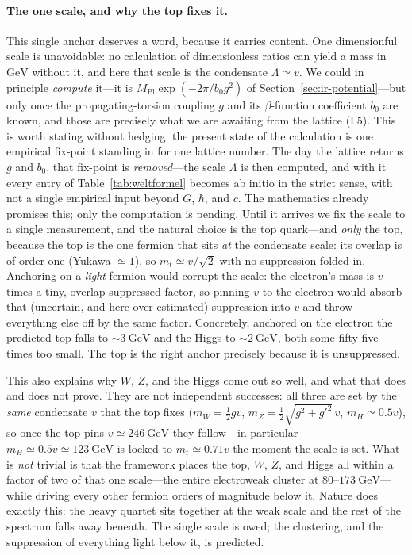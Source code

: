 \paragraph{The one scale, and why the top fixes it.}
This single anchor deserves a word, because it carries content. One dimensionful scale is
unavoidable: no calculation of dimensionless ratios can yield a mass in $\mathrm{GeV}$ without
it, and here that scale is the condensate $\Lambda\simeq v$. We could in principle \emph{compute}
it---it is $M_{\mathrm{Pl}}\exp(-2\pi/b_0 g^2)$ of Section~\ref{sec:ir-potential}---but only once
the propagating-torsion coupling $g$ and its $\beta$-function coefficient $b_0$ are known, and
those are precisely what we are awaiting from the lattice (L5). This is worth stating without
hedging: the present state of the calculation is one empirical fix-point standing in for one
lattice number. The day the lattice returns $g$ and $b_0$, that fix-point is \emph{removed}---the
scale $\Lambda$ is then computed, and with it every entry of Table~\ref{tab:weltformel} becomes
ab initio in the strict sense, with not a single empirical input beyond $G$, $\hbar$, and $c$. The
mathematics already promises this; only the computation is pending. Until it arrives we fix the
scale to a single measurement, and the natural choice is
the top quark---and \emph{only} the top, because the top is the one fermion that sits \emph{at}
the condensate scale: its overlap is of order one (Yukawa $\simeq1$), so $m_t\simeq v/\sqrt2$ with
no suppression folded in. Anchoring on a \emph{light} fermion would corrupt the scale: the
electron's mass is $v$ times a tiny, overlap-suppressed factor, so pinning $v$ to the electron
would absorb that (uncertain, and here over-estimated) suppression into $v$ and throw everything
else off by the same factor. Concretely, anchored on the electron the predicted top falls to
$\sim3~\mathrm{GeV}$ and the Higgs to $\sim2~\mathrm{GeV}$, both some fifty-five times too small.
The top is the right anchor precisely because it is unsuppressed.

This also explains why $W$, $Z$, and the Higgs come out so well, and what that does and does not
prove. They are not independent successes: all three are set by the \emph{same} condensate $v$
that the top fixes ($m_W=\tfrac12 gv$, $m_Z=\tfrac12\sqrt{g^2+g'^2}\,v$, $m_H\simeq0.5v$), so once
the top pins $v\simeq246~\mathrm{GeV}$ they follow---in particular $m_H\simeq0.5v\simeq123~
\mathrm{GeV}$ is locked to $m_t\simeq0.71v$ the moment the scale is set. What is \emph{not} trivial
is that the framework places the top, $W$, $Z$, and Higgs all within a factor of two of that one
scale---the entire electroweak cluster at $80$--$173~\mathrm{GeV}$---while driving every other
fermion orders of magnitude below it. Nature does exactly this: the heavy quartet sits together at
the weak scale and the rest of the spectrum falls away beneath. The single scale is owed; the
clustering, and the suppression of everything light below it, is predicted.

